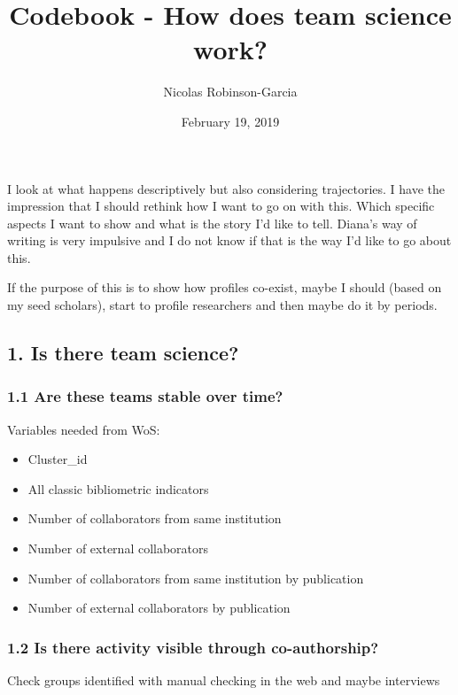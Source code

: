 \documentclass[]{article}
\title{Codebook - How does team science work?}
\author{Nicolas Robinson-Garcia}
\date{February 19, 2019}
\providecommand{\tightlist}{%
  \setlength{\itemsep}{0pt}\setlength{\parskip}{0pt}}
\begin{document}
\maketitle

I look at what happens descriptively but also considering trajectories.
I have the impression that I should rethink how I want to go on with
this. Which specific aspects I want to show and what is the story I'd
like to tell. Diana's way of writing is very impulsive and I do not know
if that is the way I'd like to go about this.

If the purpose of this is to show how profiles co-exist, maybe I should
(based on my seed scholars), start to profile researchers and then maybe
do it by periods.

\hypertarget{is-there-team-science}{%
\subsection{1. Is there team science?}\label{is-there-team-science}}

\hypertarget{are-these-teams-stable-over-time}{%
\subsubsection{1.1 Are these teams stable over
time?}\label{are-these-teams-stable-over-time}}

Variables needed from WoS:

\begin{itemize}
\tightlist
\item
  Cluster\_id
\item
  All classic bibliometric indicators
\item
  Number of collaborators from same institution
\item
  Number of external collaborators
\item
  Number of collaborators from same institution by publication
\item
  Number of external collaborators by publication
\end{itemize}

\hypertarget{is-there-activity-visible-through-co-authorship}{%
\subsubsection{1.2 Is there activity visible through
co-authorship?}\label{is-there-activity-visible-through-co-authorship}}

Check groups identified with manual checking in the web and maybe
interviews
\end{document}
